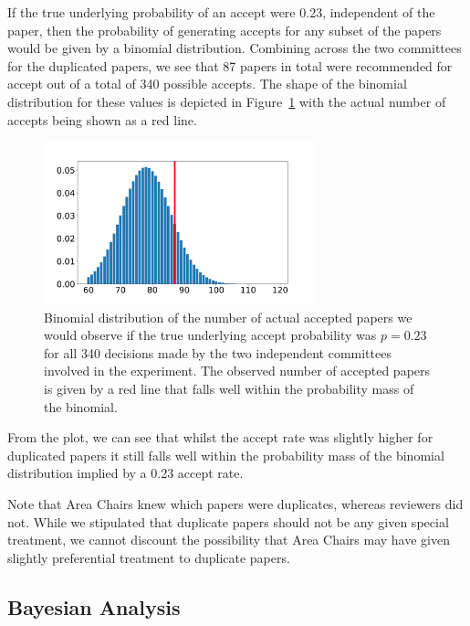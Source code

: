 If the true underlying probability of an accept were 0.23, independent
of the paper, then the probability of generating accepts for any subset
of the papers would be given by a binomial distribution. Combining
across the two committees for the duplicated papers, we see that 87
papers in total were recommended for accept out of a total of 340
possible accepts. The shape of the binomial distribution for these values is 
depicted in Figure~\ref{fig:uncertainty-accept-rate} with the actual number of accepts being shown as a red line.


\begin{figure}[htb]
\centering
\includegraphics[width=0.70\textwidth]{diagrams/neurips/uncertainty-accept-rate.pdf}


\caption{Binomial distribution of the number of actual accepted papers we would observe if the true underlying accept probability was $p=0.23$ for all 340 decisions made by the two independent committees involved in the experiment. The observed number of accepted papers is given by a red line that falls well within the probability mass of the binomial.}
\label{fig:uncertainty-accept-rate}
\end{figure}

From the plot, we can see that whilst the accept rate was slightly
higher for duplicated papers it still falls well within the 
probability mass of the binomial distribution implied by a 0.23 accept rate.

Note that Area Chairs knew which papers were duplicates, whereas
reviewers did not. While we stipulated that duplicate papers should not
be any given special treatment, we cannot discount the possibility that
Area Chairs may have given slightly preferential treatment to duplicate
papers.

\subsection{Bayesian Analysis}\label{bayesian-analysis}

